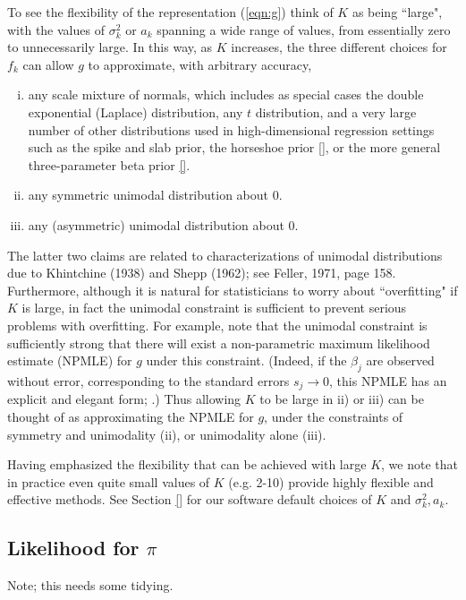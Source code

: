 \documentclass[10pt]{article}
\begin{document}
To see the flexibility of the representation (\ref{eqn:g})
think of $K$ as being ``large", with the values of $\sigma^2_k$ or $a_k$ 
spanning a wide range of values, from
essentially zero to unnecessarily large. In this way, as $K$ increases, the three different choices for $f_k$ can allow $g$ to approximate,
with arbitrary accuracy,
\begin{enumerate}[i)]
\item any scale mixture of normals, which includes as special cases
the double exponential (Laplace) distribution, any $t$ distribution, and a very large number of other distributions used in 
high-dimensional regression settings such as the spike and slab prior, the horseshoe prior \ref{}, or the more general three-parameter beta prior \ref{}.
\item any symmetric unimodal distribution about 0.
\item any (asymmetric) unimodal distribution about 0.
\end{enumerate}
The latter two claims are related to characterizations of unimodal distributions due to Khintchine (1938) and  Shepp (1962); see Feller, 1971, page  158. 
Furthermore, although it is natural for statisticians to worry about ``overfitting" if $K$ is large, 
in fact the unimodal constraint is sufficient to prevent serious problems with overfitting. For example, note that the unimodal
constraint is sufficiently strong that there will exist a non-parametric
maximum likelihood estimate (NPMLE) for $g$ under this constraint. (Indeed, if the $\beta_j$ are observed without error, corresponding to the standard errors $s_j \rightarrow 0$, this NPMLE has an explicit and elegant form; \cite{grenander}.)
Thus allowing $K$ to be large in ii) or iii) can be thought of as approximating the NPMLE for $g$, under the constraints of symmetry and unimodality (ii), or unimodality alone (iii). 

Having emphasized the flexibility that can be achieved with large $K$, we note that in practice even quite small values of $K$ (e.g. 2-10) provide highly flexible
and effective methods. See Section \ref{} for our software default choices of $K$ and $\sigma^2_k,a_k$.


\subsection*{Likelihood for $\pi$}

Note; this needs some tidying.
\end{document}
